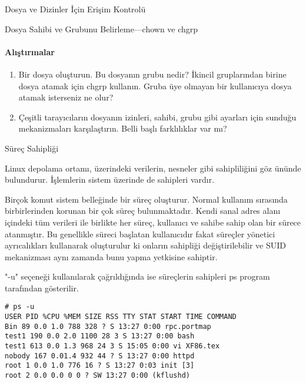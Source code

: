 \begin{section}{Dosya ve Dizinler İçin Erişim Kontrolü}
\begin{subsection}{Dosya Sahibi ve Grubunu Belirleme—chown ve chgrp}
\paragraph{{\Huge{\PencilLeftDown}}Alıştırmalar}{
\begin{enumerate}
 \item Bir dosya oluşturun. Bu dosyanın grubu nedir? İkincil gruplarından birine dosya atamak için chgrp kullanın. Gruba üye olmayan bir kullanıcıya dosya atamak isterseniz ne olur?
 \item Çeşitli tarayıcıların dosyanın izinleri, sahibi, grubu gibi ayarları için sunduğu mekanizmaları karşılaştırın. Belli başlı farklılıklar var mı?
 \end{enumerate}}
\end{subsection}
\end{section}
\begin{section}{Süreç Sahipliği}

Linux depolama ortamı, üzerindeki verilerin, nesneler gibi sahipliliğini göz ününde bulundurur. İşlemlerin sistem üzerinde de sahipleri vardır.

Birçok komut sistem belleğinde bir süreç oluşturur. Normal kullanım sırasında birbirlerinden korunan bir çok süreç bulunmaktadır. Kendi sanal adres alanı içindeki tüm verileri ile birlikte her süreç, kullanıcı ve sahibe sahip olan bir sürece atanmıştır. Bu genellikle süreci başlatan kullanıcıdır fakat süreçler yönetici ayrıcalıkları kullanarak oluşturulur ki onların sahipliği değiştirilebilir ve SUID mekanizması aynı zamanda bunu yapma yetkisine sahiptir.
 
"-u" seçeneği kullanılarak çağrıldığında ise süreçlerin sahipleri ps program tarafından gösterilir.
\begin{verbatim}
# ps -u
USER PID %CPU %MEM SIZE RSS TTY STAT START TIME COMMAND
Bin 89 0.0 1.0 788 328 ? S 13:27 0:00 rpc.portmap
test1 190 0.0 2.0 1100 28 3 S 13:27 0:00 bash
test1 613 0.0 1.3 968 24 3 S 15:05 0:00 vi XF86.tex
nobody 167 0.01.4 932 44 ? S 13:27 0:00 httpd
root 1 0.0 1.0 776 16 ? S 13:27 0:03 init [3]
root 2 0.0 0.0 0 0 ? SW 13:27 0:00 (kflushd)
\end{verbatim}
\end{section}
